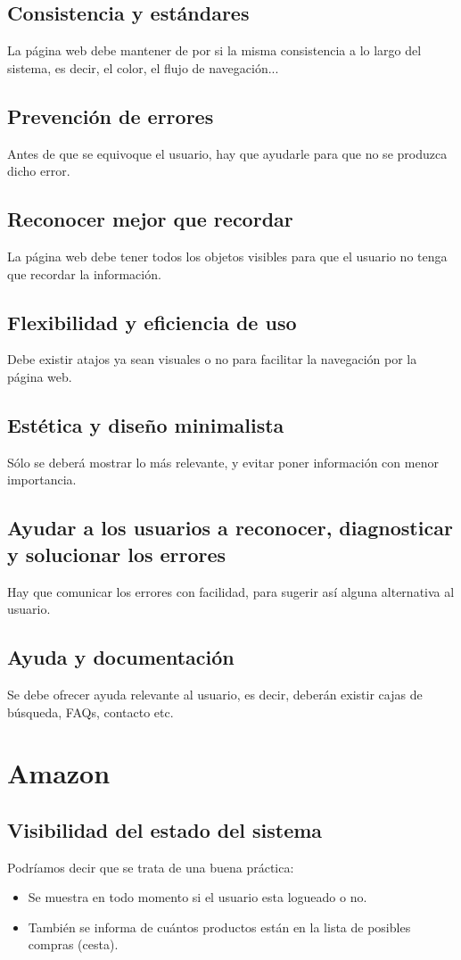 \documentclass[openany,overnay,a4paper, twoside, 14pt]{book}
\begin{document}
\section*{Consistencia y estándares}
La página web debe mantener de por si la misma consistencia a lo largo del sistema, es decir, el color, el flujo de navegación...
\section*{Prevención de errores}
Antes de que se equivoque el usuario, hay que ayudarle para que no se produzca dicho error.
\section*{Reconocer mejor que recordar}
La página web debe tener todos los objetos visibles para que el usuario no tenga que recordar la información.
\section*{Flexibilidad y eficiencia de uso}
Debe existir atajos ya sean visuales o no para facilitar la navegación por la página web.
\section*{Estética y diseño minimalista}
Sólo se deberá mostrar lo más relevante, y evitar poner información con menor importancia.
\section*{Ayudar a los usuarios a reconocer, diagnosticar y solucionar los errores}
Hay que comunicar los errores con facilidad, para sugerir así alguna alternativa al usuario.
\section*{Ayuda y documentación}
Se debe ofrecer ayuda relevante al usuario, es decir, deberán existir cajas de búsqueda, FAQs, contacto etc.
\setcounter{chapter}{2}
\chapter*{Amazon}
\section*{Visibilidad del estado del sistema}
Podríamos decir que se trata de una buena práctica:
\begin{itemize}
\item Se muestra en todo momento si el usuario esta logueado o no.
\item También se informa de cuántos productos están en la lista de posibles compras (cesta).
\end{itemize}
\end{document}
